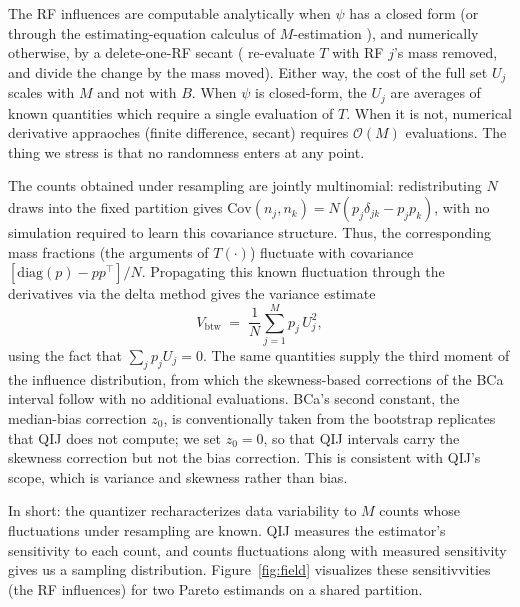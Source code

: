 \documentclass[runningheads]{llncs}
\newcommand{\ifl}{\psi}
\newcommand{\Vcell}{V_{\mathrm{btw}}}
\begin{document}
The RF influences are computable analytically when $\ifl$ has a closed form (or through the estimating-equation calculus of $M$-estimation \cite{stefanski2002}), and numerically otherwise, by a delete-one-RF secant ( re-evaluate $T$ with RF $j$'s mass removed, and divide the change by the mass moved). Either way, the cost of the full set $U_j$ scales with $M$ and not with $B$. When $\psi$ is closed-form, the $U_j$ are averages of known quantities which require a single evaluation of $T$. When it is not, numerical derivative appraoches (finite difference, secant) requires $\mathcal{O}(M)$ evaluations. The thing we stress is that no randomness enters at any point. 

The counts obtained under resampling are jointly multinomial: redistributing $N$ draws into the fixed partition gives $\mathrm{Cov}(n_j, n_k) = N(p_j \delta_{jk} - p_j p_k)$, with no simulation required to learn this covariance structure. Thus, the corresponding mass fractions (the arguments of $T(\cdot)$) fluctuate with covariance $[\mathrm{diag}(p) - pp^{\top}]/N$. Propagating this known fluctuation through the derivatives via the delta method gives the variance estimate
\begin{equation}\label{eq:Vcell}
\Vcell \;=\; \frac1N \sum_{j=1}^{M} p_j\, U_j^{2},
\end{equation}
using the fact that $\sum_j p_j U_j = 0$. The same quantities supply the third moment of the influence distribution, from which the skewness-based corrections of the BCa interval \cite{efron1987} follow with no additional evaluations. BCa's second constant, the median-bias correction $z_0$, is conventionally taken from the bootstrap replicates that QIJ does not compute; we set $z_0 = 0$, so that QIJ intervals carry the skewness correction but not the bias correction. This is consistent with QIJ's scope, which is
variance and skewness rather than bias. 

In short: the quantizer recharacterizes data variability to $M$ counts whose fluctuations under resampling are known. QIJ measures the estimator's sensitivity to each count, and counts fluctuations along with measured sensitivity gives us a sampling distribution. Figure~\ref{fig:field} visualizes these sensitivvities (the RF influences) for two Pareto estimands on a shared partition.
\end{document}

